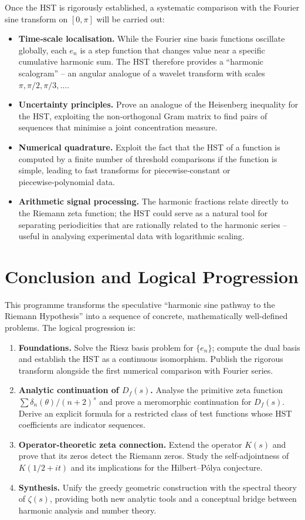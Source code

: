 \documentclass[11pt,a4paper]{article}
\begin{document}
Once the HST is rigorously established, a systematic comparison with the Fourier sine transform on \([0,\pi]\) will be carried out:

\begin{itemize}
    \item \textbf{Time‑scale localisation.} While the Fourier sine basis functions oscillate globally, each \(e_n\) is a step function that changes value near a specific cumulative harmonic sum. The HST therefore provides a “harmonic scalogram” – an angular analogue of a wavelet transform with scales \(\pi, \pi/2, \pi/3, \dots\).
    \item \textbf{Uncertainty principles.} Prove an analogue of the Heisenberg inequality for the HST, exploiting the non‑orthogonal Gram matrix to find pairs of sequences that minimise a joint concentration measure.
    \item \textbf{Numerical quadrature.} Exploit the fact that the HST of a function is computed by a finite number of threshold comparisons if the function is simple, leading to fast transforms for piecewise‑constant or piecewise‑polynomial data.
    \item \textbf{Arithmetic signal processing.} The harmonic fractions relate directly to the Riemann zeta function; the HST could serve as a natural tool for separating periodicities that are rationally related to the harmonic series – useful in analysing experimental data with logarithmic scaling.
\end{itemize}

\section{Conclusion and Logical Progression}

This programme transforms the speculative “harmonic sine pathway to the Riemann Hypothesis” into a sequence of concrete, mathematically well‑defined problems. The logical progression is:

\begin{enumerate}[start=1]
    \item \textbf{Foundations.} Solve the Riesz basis problem for \(\{e_n\}\); compute the dual basis and establish the HST as a continuous isomorphism. Publish the rigorous transform alongside the first numerical comparison with Fourier series.
    \item \textbf{Analytic continuation of \(D_f(s)\).} Analyse the primitive zeta function \(\sum \delta_n(\theta)/(n+2)^s\) and prove a meromorphic continuation for \(D_f(s)\). Derive an explicit formula for a restricted class of test functions whose HST coefficients are indicator sequences.
    \item \textbf{Operator‑theoretic zeta connection.} Extend the operator \(K(s)\) and prove that its zeros detect the Riemann zeros. Study the self‑adjointness of \(K(1/2+it)\) and its implications for the Hilbert–Pólya conjecture.
    \item \textbf{Synthesis.} Unify the greedy geometric construction with the spectral theory of \(\zeta(s)\), providing both new analytic tools and a conceptual bridge between harmonic analysis and number theory.
\end{enumerate}
\end{document}
